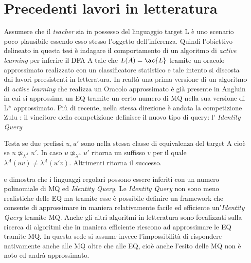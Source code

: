 \section{Precedenti lavori in letteratura}
Assumere che il \textit{teacher} sia in possesso del linguaggio target \ac{L} è uno scenario poco plausibile essendo esso stesso l'oggetto dell'inferenza.
Quindi l'obiettivo delineato in questa tesi è indagare il comportamento di un algoritmo di \textit{active learning} per inferire il \ac{DFA} A tale che $L(A) =\ac{L}$ tramite un oracolo approssimato realizzato con un classificatore statistico e tale intento si discosta dai lavori preesistenti in letteratura. In realtà una prima versione di un algoritmo di \textit{active learning} che realizza un Oracolo approssimato è già presente in Angluin \cite{Angluin87} in cui si approssima un \ac{EQ} tramite un certo numero di \ac{MQ} nella sua versione di L* approssimato. Più di recente, nella stessa direzione è andata la competizione Zulu \cite{Zulu10}: il vincitore della competizione \cite{Howar12} definisce il nuovo tipo di query: l'  \textit{Identity Query}
\begin{definizione*} Testa se due prefissi $u,u'$ sono nella stessa classe di equivalenza del target A cioè se $u \not\simeq_{\lambda^{A}} \! u'$. In caso $u \not\simeq_{\lambda^{A}} \! u'$ ritorna un suffisso $v$ per il quale $\lambda^{A}(uv) \neq \lambda^{A}(u'v)$. Altrimenti ritorna il successo. 
\end{definizione*}
e dimostra che i linguaggi regolari possono essere inferiti con un numero polinomiale di \ac{MQ} ed \textit{Identity Query}.       
Le \textit{Identity Query} non sono meno realistiche delle \ac{EQ} ma tramite esse è possibile definire un framework che consente di approssimare in maniera relativamente facile ed efficiente un'\textit{Identity Query} tramite \ac{MQ}.  Anche gli altri algoritmi in letteratura sono focalizzati sulla ricerca di algoritmi che in maniera efficiente riescono ad approssimare le \ac{EQ} tramite \ac{MQ}.  In questa sede si assume invece l'impossibilità di rispondere nativamente anche alle \ac{MQ} oltre che alle \ac{EQ}, cioè  anche l'esito delle \ac{MQ} non è noto ed andrà approssimato.

